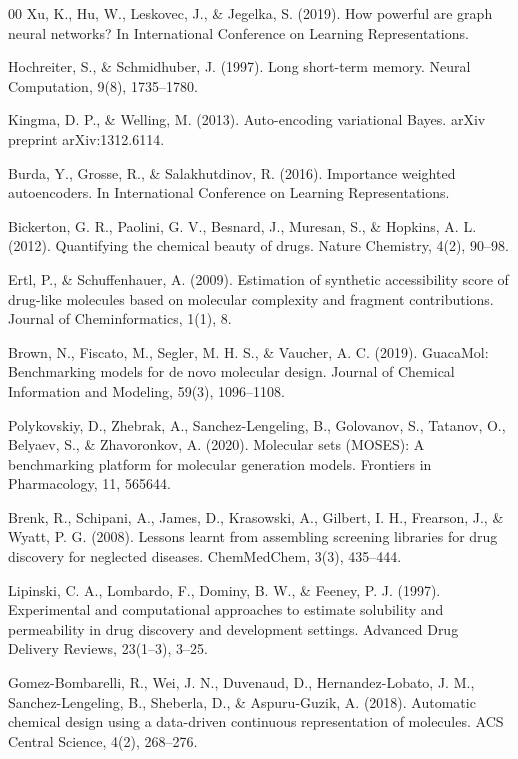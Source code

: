 \documentclass[conference]{IEEEtran}
\begin{document}
\begin{thebibliography}{00}
Xu, K., Hu, W., Leskovec, J., \& Jegelka, S. (2019). How powerful are graph neural networks? In International Conference on Learning Representations.

Hochreiter, S., \& Schmidhuber, J. (1997). Long short-term memory. Neural Computation, 9(8), 1735--1780.

Kingma, D. P., \& Welling, M. (2013). Auto-encoding variational Bayes. arXiv preprint arXiv:1312.6114.

Burda, Y., Grosse, R., \& Salakhutdinov, R. (2016). Importance weighted autoencoders. In International Conference on Learning Representations.

Bickerton, G. R., Paolini, G. V., Besnard, J., Muresan, S., \& Hopkins, A. L. (2012). Quantifying the chemical beauty of drugs. Nature Chemistry, 4(2), 90--98.

Ertl, P., \& Schuffenhauer, A. (2009). Estimation of synthetic accessibility score of drug-like molecules based on molecular complexity and fragment contributions. Journal of Cheminformatics, 1(1), 8.

Brown, N., Fiscato, M., Segler, M. H. S., \& Vaucher, A. C. (2019). GuacaMol: Benchmarking models for de novo molecular design. Journal of Chemical Information and Modeling, 59(3), 1096--1108.

Polykovskiy, D., Zhebrak, A., Sanchez-Lengeling, B., Golovanov, S., Tatanov, O., Belyaev, S., \& Zhavoronkov, A. (2020). Molecular sets (MOSES): A benchmarking platform for molecular generation models. Frontiers in Pharmacology, 11, 565644.

Brenk, R., Schipani, A., James, D., Krasowski, A., Gilbert, I. H., Frearson, J., \& Wyatt, P. G. (2008). Lessons learnt from assembling screening libraries for drug discovery for neglected diseases. ChemMedChem, 3(3), 435--444.

Lipinski, C. A., Lombardo, F., Dominy, B. W., \& Feeney, P. J. (1997). Experimental and computational approaches to estimate solubility and permeability in drug discovery and development settings. Advanced Drug Delivery Reviews, 23(1--3), 3--25.

Gomez-Bombarelli, R., Wei, J. N., Duvenaud, D., Hernandez-Lobato, J. M., Sanchez-Lengeling, B., Sheberla, D., \& Aspuru-Guzik, A. (2018). Automatic chemical design using a data-driven continuous representation of molecules. ACS Central Science, 4(2), 268--276.

\end{thebibliography}
\end{document}
